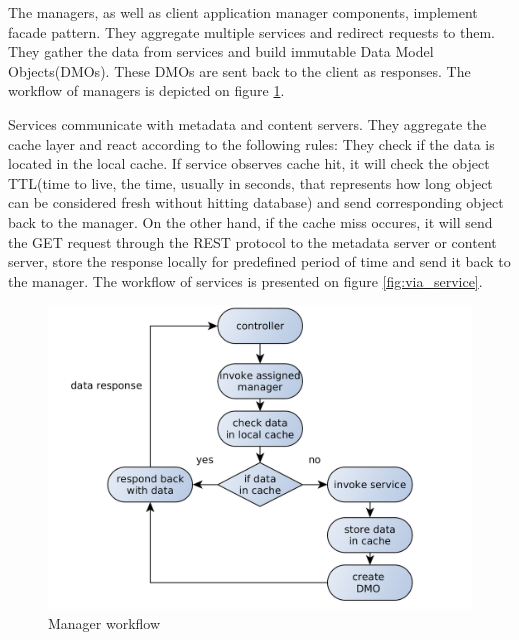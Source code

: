 The managers, as well as client application manager components, implement facade pattern. They aggregate multiple services and redirect requests to them. They gather the data from services and build immutable Data Model Objects(DMOs). These DMOs are sent back to the client as responses. The workflow of managers is depicted on figure \ref{fig:via_manager}.

Services communicate with metadata and content servers. They aggregate the cache layer and react according to the following rules:
They check if the data is located in the local cache. If service observes cache hit, it will check the object TTL(time to live, the time, usually in seconds, that represents how long object can be considered fresh without hitting database) and send corresponding object back to the manager. On the other hand, if the cache miss occures, it will send the GET request through the REST protocol to the metadata server or content server, store the response locally for predefined period of time and send it back to the manager. The workflow of services is presented on figure \ref{fig:via_service}.


\begin{figure}[h]
    \centering
	\includegraphics[width=\textwidth]{images/via_manager_1.png}
    \caption{Manager workflow}
    \label{fig:via_manager}
\end{figure}

